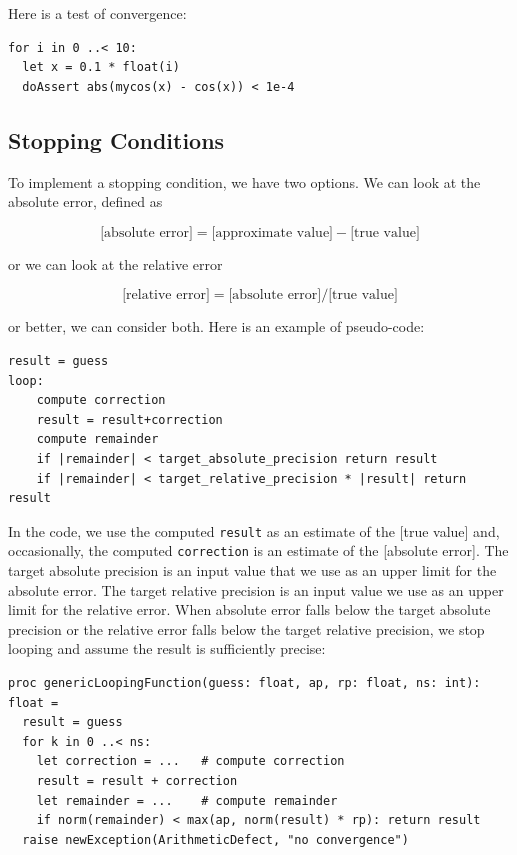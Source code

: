 \documentclass[justified, sixbynine]{tufte-book}
\def\ft{\small\tt}
\theoremstyle{plain}%
\newtheorem * {corollary}{Corollary}
\theoremstyle{definition}
\theoremstyle{remark}
\newtheorem * {remark}{Remark}
\newtheorem * {note}{Note}
\begin{document}
\begin{fullwidth}
Here is a test of convergence:

\begin{lstlisting}
for i in 0 ..< 10:
  let x = 0.1 * float(i)
  doAssert abs(mycos(x) - cos(x)) < 1e-4
\end{lstlisting}

\goodbreak\subsection{Stopping Conditions}


To implement a stopping condition, we have two options. We can look at the absolute error, defined as

\begin{equation}
\textrm{[absolute error]}=\textrm{[approximate value]}-\textrm{[true value]}
\end{equation}

or we can look at the relative error

\begin{equation}
\textrm{[relative error]}=\textrm{[absolute error]}/\textrm{[true value]}
\end{equation}

or better, we can consider both. Here is an example of pseudo-code:

\begin{lstlisting}
result = guess
loop:
    compute correction
    result = result+correction
    compute remainder
    if |remainder| < target_absolute_precision return result
    if |remainder| < target_relative_precision * |result| return result
\end{lstlisting}

In the code, we use the computed {\ft result} as an estimate of the [true value] and, occasionally, the computed {\ft correction} is an estimate of the [absolute error]. The target absolute precision is an input value that we use as an upper limit for the absolute error. The target relative precision is an input value we use as an upper limit for the relative error. When absolute error falls below the target absolute precision or the relative error falls below the target relative precision, we stop looping and assume the result is sufficiently precise:

\begin{lstlisting}
proc genericLoopingFunction(guess: float, ap, rp: float, ns: int): float =
  result = guess
  for k in 0 ..< ns:
    let correction = ...   # compute correction
    result = result + correction
    let remainder = ...    # compute remainder
    if norm(remainder) < max(ap, norm(result) * rp): return result
  raise newException(ArithmeticDefect, "no convergence")
\end{lstlisting}


\end{fullwidth}
\end{document}
